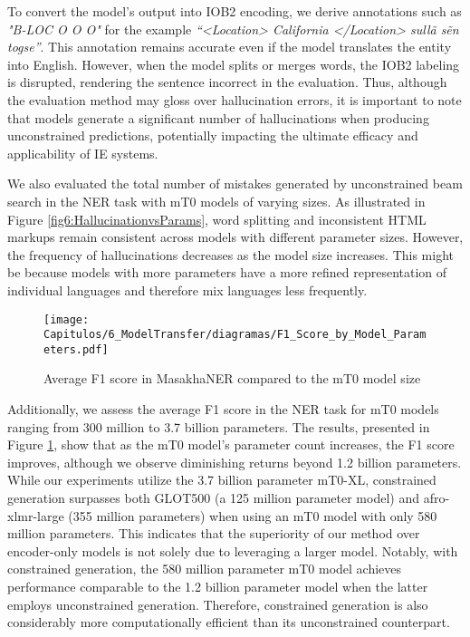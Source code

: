 To convert the model's output into IOB2 encoding, we derive annotations such as \textit{"B-LOC O O O"} for the example \textit{``<Location> California </Location> sullã sẽn togse''}. This annotation remains accurate even if the model translates the entity into English. However, when the model splits or merges words, the IOB2 labeling is disrupted, rendering the sentence incorrect in the evaluation. Thus, although the evaluation method may gloss over hallucination errors, it is important to note that models generate a significant number of hallucinations when producing unconstrained predictions, potentially impacting the ultimate efficacy and applicability of IE systems.



We also evaluated the total number of mistakes generated by unconstrained beam search in the NER task with mT0 models of varying sizes. As illustrated in Figure \ref{fig6:HallucinationvsParams}, word splitting and inconsistent HTML markups remain consistent across models with different parameter sizes. However, the frequency of hallucinations decreases as the model size increases. This might be because models with more parameters have a more refined representation of individual languages and therefore mix languages less frequently.

\begin{figure}[tbp]
    \centering
    \texttt{[image: Capitulos/6\_ModelTransfer/diagramas/F1\_Score\_by\_Model\_Parameters.pdf]}
    \caption{Average F1 score in MasakhaNER compared to the mT0 model size}
    \label{fig6:F1vsParams}
\end{figure}

Additionally, we assess the average F1 score in the NER task for mT0 models ranging from 300 million to 3.7 billion parameters. The results, presented in Figure \ref{fig6:F1vsParams}, show that as the mT0 model's parameter count increases, the F1 score improves, although we observe diminishing returns beyond 1.2 billion parameters. While our experiments utilize the 3.7 billion parameter mT0-XL, constrained generation surpasses both GLOT500 (a 125 million parameter model) and afro-xlmr-large (355 million parameters) when using an mT0 model with only 580 million parameters. This indicates that the superiority of our method over encoder-only models is not solely due to leveraging a larger model. Notably, with constrained generation, the 580 million parameter mT0 model achieves performance comparable to the 1.2 billion parameter model when the latter employs unconstrained generation. Therefore, constrained generation is also considerably more computationally efficient than its unconstrained counterpart.


